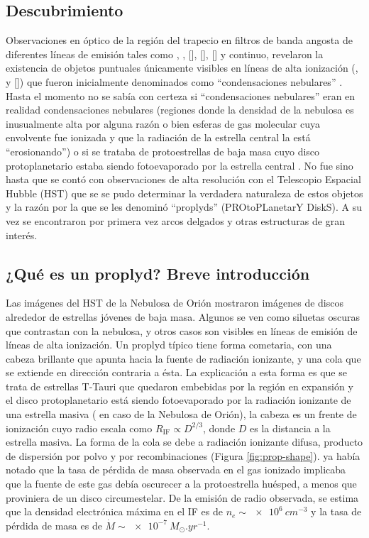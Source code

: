 \subsection{Descubrimiento}
Observaciones en óptico de la región del trapecio en filtros de banda angosta de diferentes líneas de emisión tales como , , [], [], [] y continuo, revelaron la existencia de objetos puntuales únicamente visibles en líneas de alta ionización (,  y []) que fueron inicialmente denominados como ``condensaciones nebulares'' \citep{Laques:1979}. Hasta el momento no se sabía con certeza si ``condensaciones nebulares'' eran en realidad condensaciones nebulares (regiones donde la densidad de la nebulosa es inusualmente alta por alguna razón o bien esferas de gas molecular cuya envolvente fue ionizada y que la radiación de la estrella central la está ``erosionando'') o si se trataba de protoestrellas de baja masa cuyo disco protoplanetario estaba siendo fotoevaporado por la estrella central \citep{churchwell:1987}. No fue sino hasta que se contó con observaciones de alta resolución con el Telescopio Espacial Hubble (HST) que se se pudo determinar la verdadera naturaleza de estos objetos \citep{ODell:1993} y la razón por la que se les denominó ``proplyds'' (PROtoPLanetarY DiskS). A su vez se encontraron por primera vez arcos delgados y otras estructuras de gran interés.

\subsection{¿Qué es un proplyd? Breve introducción \citep{Johnstone:1998}}
\label{sec:prop-Johnstone}

Las imágenes del HST de la Nebulosa de Orión mostraron imágenes de discos alrededor de estrellas jóvenes de baja masa. Algunos se ven como siluetas oscuras que contrastan con la nebulosa, y otros casos son visibles en líneas de emisión de líneas de alta ionización. Un proplyd típico tiene forma cometaria, con una cabeza brillante que apunta hacia la fuente de radiación ionizante, y una cola que se extiende en dirección contraria a ésta. La explicación a esta forma es que se trata de estrellas T-Tauri que quedaron embebidas por la región  en expansión y el disco protoplanetario está siendo fotoevaporado por la radiación ionizante de una estrella masiva (\thC{} en caso de la Nebulosa de Orión), la cabeza es un frente de ionización cuyo radio escala como $R_{\mathrm{IF}} \propto D^{2/3}$, donde $D$ es la distancia a la estrella masiva. La forma de la cola se debe a radiación ionizante difusa, producto de dispersión por polvo y por recombinaciones (Figura \ref{fig:prop-shape}). \citet{churchwell:1987} ya había notado que la tasa de pérdida de masa observada en el gas ionizado implicaba que la fuente de este gas debía oscurecer a la protoestrella huésped, a menos que proviniera de un disco circumestelar. De la emisión de radio observada, se estima que la densidad electrónica máxima en el IF es de $n_e \sim \SI{e6}{cm^{-3}}$ y la tasa de pérdida de masa es de $\dot{M} \sim \SI{e-7}{M_\odot.yr^{-1}}$.

